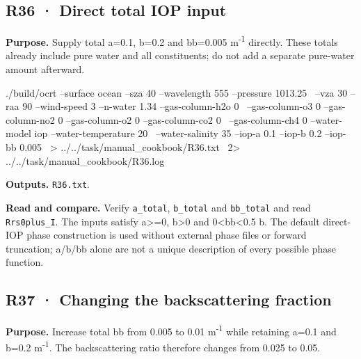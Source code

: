 
\subsection{R36 · Direct total IOP input}
\label{sec:auto:09_cookbook:6.11}

\label{recipe:R36}

\textbf{Purpose. }Supply total a=0.1, b=0.2 and bb=0.005 m\textsuperscript{-1} directly. These totals already include pure water and all constituents; do not add a separate pure-water amount afterward.

\noindent\begin{minipage}{\linewidth}
\begin{ManualCode}

./build/ocrt --surface ocean --sza 40 --wavelength 555 --pressure 1013.25 \
  --vza 30 --raa 90 --wind-speed 3 --n-water 1.34 --gas-column-h2o 0 \
  --gas-column-o3 0 --gas-column-no2 0 --gas-column-o2 0 --gas-column-co2 0 \
  --gas-column-ch4 0 --water-model iop --water-temperature 20 \
  --water-salinity 35 --iop-a 0.1 --iop-b 0.2 --iop-bb 0.005 \
  > ../../task/manual_cookbook/R36.txt \
  2> ../../task/manual_cookbook/R36.log

\end{ManualCode}
\end{minipage}\par

\textbf{Outputs. }\texttt{R36.txt}.

\textbf{Read and compare. }Verify \texttt{a\_\allowbreak{}total}, \texttt{b\_\allowbreak{}total} and \texttt{bb\_\allowbreak{}total} and read \texttt{Rrs0plus\_\allowbreak{}I}. The inputs satisfy a>=0, b>0 and 0<bb<0.5 b. The default direct-IOP phase construction is used without external phase files or forward truncation; a/b/bb alone are not a unique description of every possible phase function.


\subsection{R37 · Changing the backscattering fraction}
\label{sec:auto:09_cookbook:6.12}

\label{recipe:R37}

\textbf{Purpose. }Increase total bb from 0.005 to 0.01 m\textsuperscript{-1} while retaining a=0.1 and b=0.2 m\textsuperscript{-1}. The backscattering ratio therefore changes from 0.025 to 0.05.

